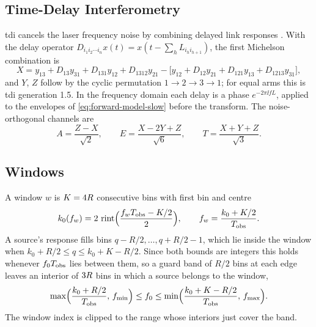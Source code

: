 \subsection{Time-Delay Interferometry}
\label{app:forward-model-tdi}

\Ac{tdi} cancels the laser frequency noise by combining delayed link responses
\citep{tinto2021time,babak2021lisa}. With the delay operator $D_{i_1i_2\cdots i_n}x(t) =
x(t - \sum_{h}L_{i_hi_{h+1}})$, the first Michelson combination is
\begin{equation}
  X = y_{13} + D_{13}y_{31} + D_{131}y_{12} + D_{1312}y_{21}
  - \bigl[y_{12} + D_{12}y_{21} + D_{121}y_{13} + D_{1213}y_{31}\bigr],
  \label{eq:forward-model-tdi-time}
\end{equation}
and $Y$, $Z$ follow by the cyclic permutation $1\to2\to3\to1$; for equal arms this is \acs{tdi}
generation 1.5. In the frequency domain each delay is a phase $e^{-2\pi\ii fL}$, applied to the
envelopes of \cref{eq:forward-model-slow} before the transform. The noise-orthogonal channels are
\citep{prince2002lisa}
\begin{equation}
  A = \frac{Z-X}{\sqrt2},\qquad E = \frac{X-2Y+Z}{\sqrt6},\qquad T = \frac{X+Y+Z}{\sqrt3}.
  \label{eq:forward-model-aet}
\end{equation}

\subsection{Windows}
\label{app:forward-model-windows}

A window $w$ is $K = 4{}R$ consecutive bins with first bin and centre
\begin{equation}
  k_0(f_{w}) = 2{}\,\operatorname{rint}\Bigl(\frac{f_{w}T_{\rm obs} - K/2}{2{}}\Bigr),
  \qquad f_{w} = \frac{k_0 + K/2}{T_{\rm obs}}.
  \label{eq:forward-model-window-start}
\end{equation}
A source's response fills bins $q-R/2,\dots,q+R/2-1$, which lie inside the window when
$k_0+R/2\le q\le k_0+K-R/2$. Since both bounds are integers this holds whenever $f_0T_{\rm obs}$ lies
between them, so a guard band of $R/2$ bins at each edge leaves an interior of
$3{}R$ bins in which a source belongs to the window,
\begin{equation}
  \max\Bigl(\frac{k_0 + R/2}{T_{\rm obs}},\, f_{\min}\Bigr) \le f_0 \le
  \min\Bigl(\frac{k_0 + K - R/2}{T_{\rm obs}},\, f_{\max}\Bigr).
  \label{eq:forward-model-window-interior}
\end{equation}
The window index is clipped to the range whose interiors just cover the band.

